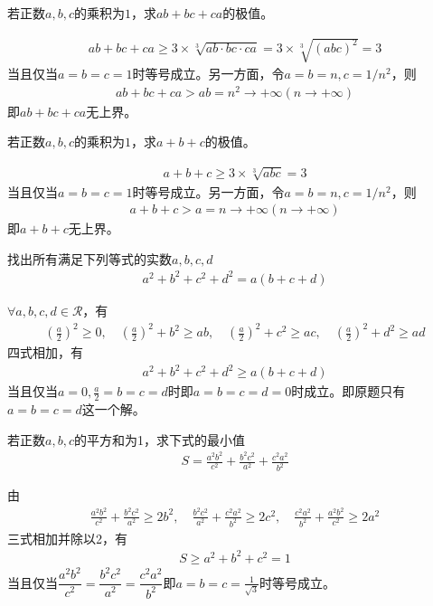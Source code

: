 \begin{example}
  若正数$a,b,c$的乘积为$1$，求$ab+bc+ca$的极值。
\end{example}
\begin{align*}
  ab+bc+ca\ge 3\times\sqrt[3]{ab\cdot bc\cdot ca}=3\times\sqrt[3]{(abc)^2}=3
\end{align*}
当且仅当$a=b=c=1$时等号成立。另一方面，令$a=b=n,c=1/n^2$，则
\begin{align*}
  ab+bc+ca>ab=n^2\to+\infty (n\to+\infty)
\end{align*}
即$ab+bc+ca$无上界。

\begin{example}
  若正数$a,b,c$的乘积为$1$，求$a+b+c$的极值。
\end{example}
\begin{align*}
  a+b+c\ge 3\times\sqrt[3]{abc}=3
\end{align*}
当且仅当$a=b=c=1$时等号成立。另一方面，令$a=b=n,c=1/n^2$，则
\begin{align*}
  a+b+c>a=n\to+\infty(n\to+\infty)
\end{align*}
即$a+b+c$无上界。

\begin{example}
  找出所有满足下列等式的实数$a,b,c,d$
  \begin{align*}
    a^2+b^2+c^2+d^2=a(b+c+d)
  \end{align*}
\end{example}

$\forall a,b,c,d\in\mathcal{R}$，有
\begin{align*}
  \left(\frac a2\right)^2\ge 0,\quad \left(\frac a2\right)^2 + b^2\ge ab,
  \quad \left(\frac a2\right)^2 + c^2\ge ac, \quad \left(\frac a2\right)^2 + d^2\ge ad
\end{align*}
四式相加，有
\begin{align*}
  a^2+b^2+c^2+d^2\ge a(b+c+d)
\end{align*}
当且仅当$a=0, \frac a2=b=c=d$时即$a=b=c=d=0$时成立。即原题只有$a=b=c=d$这一个解。

\begin{example}
  若正数$a,b,c$的平方和为1，求下式的最小值
  \begin{align*}
    S=\frac{a^2b^2}{c^2} + \frac{b^2c^2}{a^2} + \frac{c^2a^2}{b^2}
  \end{align*}
\end{example}

由
\begin{align*}
  \frac{a^2b^2}{c^2} + \frac{b^2c^2}{a^2}\ge 2b^2,\quad
  \frac{b^2c^2}{a^2} + \frac{c^2a^2}{b^2}\ge 2c^2,\quad
  \frac{c^2a^2}{b^2} + \frac{a^2b^2}{c^2}\ge 2a^2
\end{align*}
三式相加并除以2，有
\begin{align*}
  S\ge a^2+b^2+c^2=1
\end{align*}
当且仅当$\dfrac{a^2b^2}{c^2} = \dfrac{b^2c^2}{a^2} = \dfrac{c^2a^2}{b^2}$即$a=b=c=\frac1{\sqrt3}$时等号成立。


